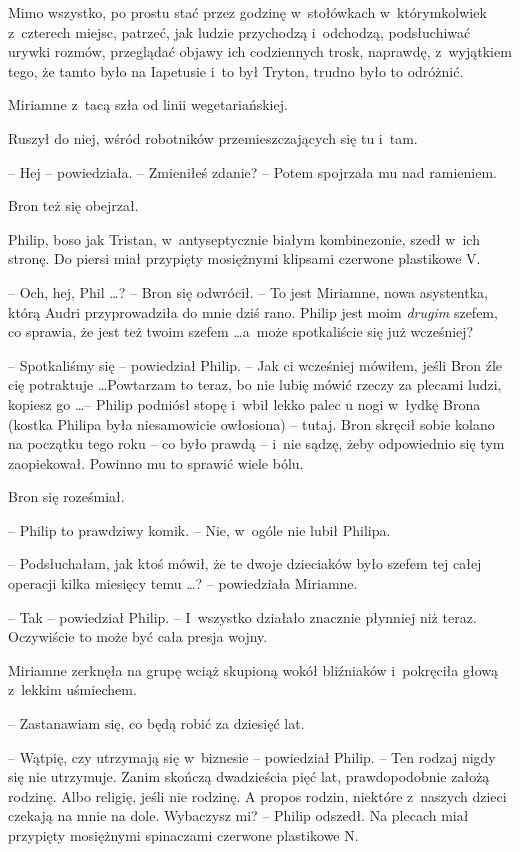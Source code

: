 \documentclass[oneside,polish,11pt,rmheadings]{mwbk}
\begin{document}
Mimo wszystko, po prostu stać przez godzinę w~stołówkach w~którymkolwiek z~czterech miejsc, patrzeć, jak ludzie przychodzą i~odchodzą, podsłuchiwać urywki rozmów, przeglądać objawy ich codziennych trosk, naprawdę, z~wyjątkiem tego, że tamto było na Iapetusie i~to był Tryton, trudno było to odróżnić. 

Miriamne z~tacą szła od linii wegetariańskiej. 

Ruszył do niej, wśród robotników przemieszczających się tu i~tam. 

-- Hej -- powiedziała. -- Zmieniłeś zdanie? -- Potem spojrzała mu nad ramieniem. 

Bron też się obejrzał. 

Philip, boso jak Tristan, w~antyseptycznie białym kombinezonie, szedł w~ich stronę. Do piersi miał przypięty mosiężnymi klipsami czerwone plastikowe V. 

-- Och, hej, Phil \ldots ? -- Bron się odwrócił. -- To jest Miriamne, nowa asystentka, którą Audri przyprowadziła do mnie dziś rano. Philip jest moim \textit{drugim } szefem, co sprawia, że jest też twoim szefem \ldots  a~może spotkaliście się już wcześniej? 

-- Spotkaliśmy się -- powiedział Philip. -- Jak ci wcześniej mówiłem, jeśli  Bron źle cię potraktuje \ldots  Powtarzam to teraz, bo nie lubię mówić rzeczy za plecami ludzi, kopiesz go \ldots  -- Philip podniósł stopę i~wbił lekko palec u nogi w~łydkę Brona (kostka Philipa była niesamowicie owłosiona) -- tutaj. Bron skręcił sobie kolano na początku tego roku -- co było prawdą -- i~nie sądzę, żeby odpowiednio się tym zaopiekował. Powinno mu to sprawić wiele bólu. 

Bron się roześmiał. 

-- Philip to prawdziwy komik. -- Nie, w~ogóle nie lubił Philipa. 

-- Podsłuchałam, jak ktoś mówił, że te dwoje dzieciaków było szefem tej całej operacji kilka miesięcy temu \ldots ? -- powiedziała Miriamne. 

-- Tak -- powiedział Philip. -- I~wszystko działało znacznie płynniej niż teraz. Oczywiście to może być cała presja wojny. 

Miriamne zerknęła na grupę wciąż skupioną wokół bliźniaków i~pokręciła głową z~lekkim uśmiechem. 

-- Zastanawiam się, co będą robić za dziesięć lat. 

-- Wątpię, czy utrzymają się w~biznesie -- powiedział Philip. -- Ten rodzaj nigdy się nie utrzymuje. Zanim skończą dwadzieścia pięć lat, prawdopodobnie założą rodzinę. Albo religię, jeśli nie rodzinę. A propos rodzin, niektóre z~naszych dzieci czekają na mnie na dole. Wybaczysz mi? -- Philip odszedł. Na plecach miał przypięty mosiężnymi spinaczami czerwone plastikowe N. 
\end{document}

